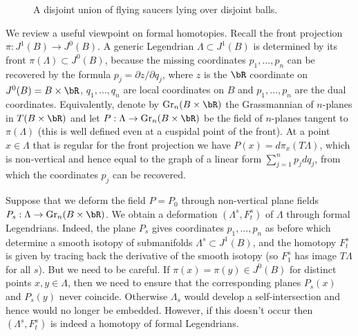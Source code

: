 \documentclass[JEP,XML,SOM,Unicode,NoFloatCountersInSection]{cedram}
\theoremstyle{plain}
\theoremstyle{definition}
\begin{document}
\begin{figure}[htbp]
\begin{center}
\caption{\smaller A disjoint union of flying saucers lying over disjoint balls.}
\label{FigureDisjointUnion}
\end{center}
\end{figure}

We review a useful viewpoint on formal homotopies. Recall the front projection $\pi:J^1(B) \to J^0(B)$. A generic Legendrian $\Lambda \subset J^1(B)$ is determined by its front $\pi(\Lambda) \subset J^0(B)$, because the missing coordinates $p_1, \ldots, p_n$ can be recovered by the formula $p_j = \partial z / \partial q_j$, where $z$ is the $\bR$ coordinate on $J^0(B)=B \times \bR$, $q_1, \ldots, q_n$ are local coordinates on $B$ and $p_1, \ldots, p_n$ are the dual coordinates. Equivalently, denote by $\text{Gr}_n(B \times \bR)$ the Grassmannian of $n$-planes in $T(B \times \bR)$ and let $P: \Lambda \to \text{Gr}_n(B \times \bR)$ be the field of $n$-planes tangent to $\pi(\Lambda)$ (this is well defined even at a cuspidal point of the front). At a point $x \in \Lambda$ that is regular for the front projection we have $P(x)=d\pi_x(T \Lambda)$, which is non-vertical and hence equal to the graph of a linear form $\sum_{j=1}^n p_j dq_j$, from which the coordinates $p_j$ can be recovered.

Suppose that we deform the field $P=P_0$ through non-vertical plane fields \hbox{$P_s:\Lambda \to \text{Gr}_n(B \times \bR)$}. We obtain a deformation $(\Lambda^s,F_t^s)$ of $\Lambda$ through formal Legendrians. Indeed, the plane $P_s$ gives coordinates $p_1, \ldots, p_n$ as before which determine a smooth isotopy of submanifolds $\Lambda^s \subset J^1(B)$, and the homotopy $F^s_t$ is given by tracing back the derivative of the smooth isotopy (so $F^s_1$ has image $T \Lambda$ for all $s$). But we need to be careful. If $\pi(x)=\pi(y) \in J^0(B)$ for distinct points $x,y \in \Lambda$, then we need to ensure that the corresponding planes $P_s(x)$ and $P_s(y)$ never coincide. Otherwise $\Lambda_s$ would develop a self-intersection and hence would no longer be embedded. However, if this doesn't occur then $(\Lambda^s,F^s_t)$ is indeed a homotopy of formal Legendrians. 
\end{document}
